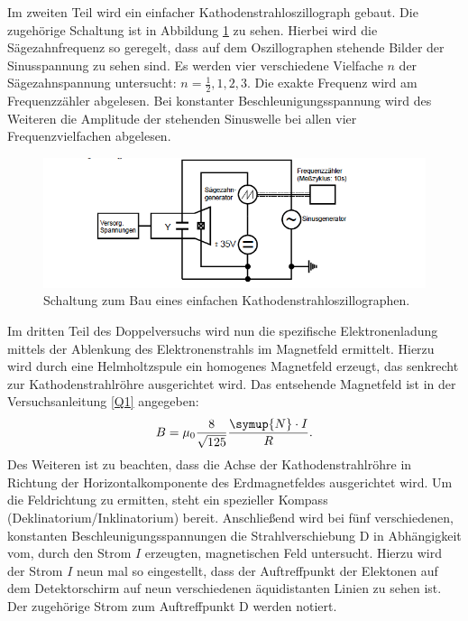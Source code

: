 \noindent Im zweiten Teil wird ein einfacher Kathodenstrahloszillograph gebaut. Die zugehörige Schaltung
ist in Abbildung \ref{abb5} zu sehen. Hierbei wird die Sägezahnfrequenz so geregelt, dass auf dem Oszillographen
stehende Bilder der Sinusspannung zu sehen sind. Es werden vier verschiedene Vielfache $n$ der
Sägezahnspannung untersucht: $ n = \frac{1}{2}, 1, 2, 3$. Die exakte Frequenz wird am
Frequenzzähler abgelesen. Bei konstanter Beschleunigungsspannung wird des Weiteren die Amplitude
der stehenden Sinuswelle bei allen vier Frequenzvielfachen abgelesen.
\FloatBarrier
\begin{figure}
  \centering
  \includegraphics[scale=0.5]{abl4.PNG}
  \caption{Schaltung zum Bau eines einfachen Kathodenstrahloszillographen. \cite{Q1}}
  \label{abb5}
\end{figure}
\FloatBarrier
\noindent Im dritten Teil des Doppelversuchs wird nun die spezifische Elektronenladung
mittels der Ablenkung des Elektronenstrahls im Magnetfeld ermittelt.
Hierzu wird durch eine Helmholtzspule ein homogenes Magnetfeld erzeugt, das senkrecht zur Kathodenstrahlröhre
ausgerichtet wird.
Das entsehende Magnetfeld ist in der Versuchsanleitung \ref{Q1} angegeben:
\begin{align*}
  B = \mu_0 \frac{8}{\sqrt{125}} \frac{\symup{N} \cdot I }{R}.
\end{align*}
Des Weiteren ist zu beachten, dass die Achse der Kathodenstrahlröhre in Richtung der Horizontalkomponente
des Erdmagnetfeldes ausgerichtet wird. Um die Feldrichtung zu ermitten, steht ein spezieller
Kompass (Deklinatorium/Inklinatorium) bereit.
Anschließend wird bei fünf verschiedenen, konstanten Beschleunigungsspannungen die Strahlverschiebung D
in Abhängigkeit vom, durch den Strom $I$ erzeugten, magnetischen Feld untersucht. Hierzu wird der Strom $I$
neun mal so eingestellt, dass der Auftreffpunkt der Elektonen auf dem Detektorschirm auf neun verschiedenen
äquidistanten Linien zu sehen ist. Der zugehörige Strom zum Auftreffpunkt D werden notiert.

